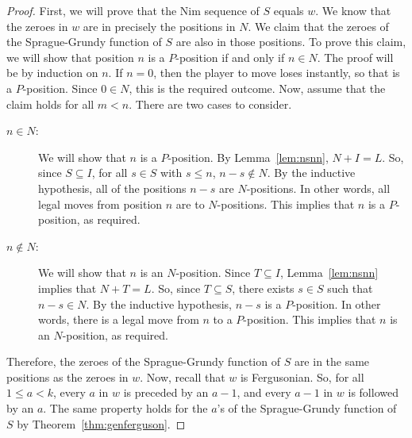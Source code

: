 \documentclass[english,12pt]{article}
\begin{document}
\begin{proof}
First, we will prove that the Nim sequence of $S$ equals $w$.  We know that the zeroes in $w$ are in precisely the positions in $N$.
We claim that the zeroes of the Sprague-Grundy function of $S$ are also in those positions.  To prove this claim, we will show that position $n$ is a $P$-position if and only if $n\in N$.  The proof will be by induction on $n$.  If $n=0$, then the player to move loses instantly, so that is a $P$-position.  Since $0\in N$, this is the required outcome.  Now, assume that the claim holds for all $m<n$.  There are two cases to consider.
\begin{description}
\item[$n\in N$:] We will show that $n$ is a $P$-position.  By Lemma~\ref{lem:nsnn}, $N+I=L$.  So, since $S\subseteq I$, for all $s\in S$ with $s\leq n$, $n-s\notin N$.  By the inductive hypothesis, all of the positions $n-s$ are $N$-positions.  In other words, all legal moves from position $n$ are to $N$-positions.  This implies that $n$ is a $P$-position, as required.
\item[$n\notin N$:] We will show that $n$ is an $N$-position.  Since $T\subseteq I$,  Lemma~\ref{lem:nsnn} implies that $N+T=L$.  So, since $T\subseteq S$, there exists $s\in S$ such that $n-s\in N$.  By the inductive hypothesis, $n-s$ is a $P$-position.  In other words, there is a legal move from $n$ to a $P$-position.  This implies that $n$ is an $N$-position, as required.
\end{description}
Therefore, the zeroes of the Sprague-Grundy function of $S$ are in the same positions as the zeroes in $w$.
Now, recall that $w$ is Fergusonian.  So, for all $1\leq a<k$, every $a$ in $w$ is preceded by an $a-1$, and every $a-1$ in $w$ is followed by an $a$.  The same property holds for the $a$'s of the Sprague-Grundy function of $S$ by Theorem~\ref{thm:genferguson}.


\end{proof}
\end{document}

